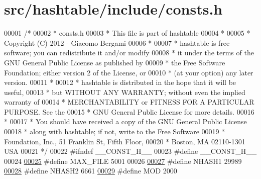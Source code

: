 \hypertarget{hashtable_2include_2consts_8h_source}{
\section{src/hashtable/include/consts.h}
}

\begin{DoxyCode}
00001 \textcolor{comment}{/*}
00002 \textcolor{comment}{ * consts.h}
00003 \textcolor{comment}{ * This file is part of hashtable}
00004 \textcolor{comment}{ *}
00005 \textcolor{comment}{ * Copyright (C) 2012 - Giacomo Bergami}
00006 \textcolor{comment}{ *}
00007 \textcolor{comment}{ * hashtable is free software; you can redistribute it and/or modify}
00008 \textcolor{comment}{ * it under the terms of the GNU General Public License as published by}
00009 \textcolor{comment}{ * the Free Software Foundation; either version 2 of the License, or}
00010 \textcolor{comment}{ * (at your option) any later version.}
00011 \textcolor{comment}{ *}
00012 \textcolor{comment}{ * hashtable is distributed in the hope that it will be useful,}
00013 \textcolor{comment}{ * but WITHOUT ANY WARRANTY; without even the implied warranty of}
00014 \textcolor{comment}{ * MERCHANTABILITY or FITNESS FOR A PARTICULAR PURPOSE.  See the}
00015 \textcolor{comment}{ * GNU General Public License for more details.}
00016 \textcolor{comment}{ *}
00017 \textcolor{comment}{ * You should have received a copy of the GNU General Public License}
00018 \textcolor{comment}{ * along with hashtable; if not, write to the Free Software}
00019 \textcolor{comment}{ * Foundation, Inc., 51 Franklin St, Fifth Floor, }
00020 \textcolor{comment}{ * Boston, MA  02110-1301  USA}
00021 \textcolor{comment}{ */}
00022 \textcolor{preprocessor}{#ifndef \_\_CONST\_H\_\_}
00023 \textcolor{preprocessor}{}\textcolor{preprocessor}{#define \_\_CONST\_H\_\_}
00024 \textcolor{preprocessor}{}
\hypertarget{hashtable_2include_2consts_8h_source_l00025}{}\hyperlink{hashtable_2include_2consts_8h_a19d34ae55fb2e29df830c11df2219da8}{00025} \textcolor{preprocessor}{#define MAX\_FILE 5001}
00026 \textcolor{preprocessor}{}
\hypertarget{hashtable_2include_2consts_8h_source_l00027}{}\hyperlink{hashtable_2include_2consts_8h_a838cf4543a124e16d8c2e248904d27b8}{00027} \textcolor{preprocessor}{#define NHASH1          29989 }
\hypertarget{hashtable_2include_2consts_8h_source_l00028}{}\hyperlink{hashtable_2include_2consts_8h_a4821f290b4ff2dbbd722a3fa07c2f2eb}{00028} \textcolor{preprocessor}{}\textcolor{preprocessor}{#define NHASH2          6661}
\hypertarget{hashtable_2include_2consts_8h_source_l00029}{}\hyperlink{hashtable_2include_2consts_8h_aca7d5718ab8c38506adb3bef2469b319}{00029} \textcolor{preprocessor}{}\textcolor{preprocessor}{#define MOD             2000}

\end{DoxyCode}
